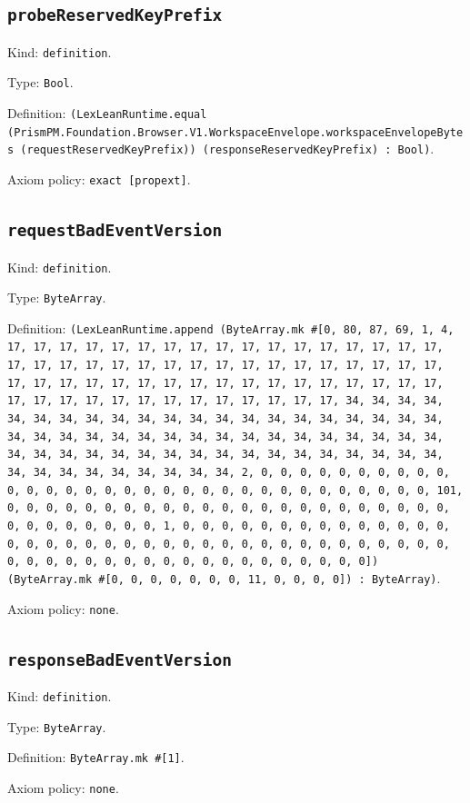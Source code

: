 \documentclass[11pt]{article}
\begin{document}
\subsection*{\texttt{probeReservedKeyPrefix}}
\noindent Kind: \texttt{definition}.\par
\noindent Type: \texttt{Bool}.\par
\noindent Definition: \texttt{(LexLeanRuntime.equal (PrismPM.Foundation.Browser.V1.WorkspaceEnvelope.workspaceEnvelopeBytes (requestReservedKeyPrefix)) (responseReservedKeyPrefix) : Bool)}.\par
\noindent Axiom policy: \texttt{exact [propext]}.\par
\subsection*{\texttt{requestBadEventVersion}}
\noindent Kind: \texttt{definition}.\par
\noindent Type: \texttt{ByteArray}.\par
\noindent Definition: \texttt{(LexLeanRuntime.append (ByteArray.mk \#[0, 80, 87, 69, 1, 4, 17, 17, 17, 17, 17, 17, 17, 17, 17, 17, 17, 17, 17, 17, 17, 17, 17, 17, 17, 17, 17, 17, 17, 17, 17, 17, 17, 17, 17, 17, 17, 17, 17, 17, 17, 17, 17, 17, 17, 17, 17, 17, 17, 17, 17, 17, 17, 17, 17, 17, 17, 17, 17, 17, 17, 17, 17, 17, 17, 17, 17, 17, 17, 17, 34, 34, 34, 34, 34, 34, 34, 34, 34, 34, 34, 34, 34, 34, 34, 34, 34, 34, 34, 34, 34, 34, 34, 34, 34, 34, 34, 34, 34, 34, 34, 34, 34, 34, 34, 34, 34, 34, 34, 34, 34, 34, 34, 34, 34, 34, 34, 34, 34, 34, 34, 34, 34, 34, 34, 34, 34, 34, 34, 34, 34, 34, 34, 34, 2, 0, 0, 0, 0, 0, 0, 0, 0, 0, 0, 0, 0, 0, 0, 0, 0, 0, 0, 0, 0, 0, 0, 0, 0, 0, 0, 0, 0, 0, 0, 0, 0, 101, 0, 0, 0, 0, 0, 0, 0, 0, 0, 0, 0, 0, 0, 0, 0, 0, 0, 0, 0, 0, 0, 0, 0, 0, 0, 0, 0, 0, 0, 0, 0, 1, 0, 0, 0, 0, 0, 0, 0, 0, 0, 0, 0, 0, 0, 0, 0, 0, 0, 0, 0, 0, 0, 0, 0, 0, 0, 0, 0, 0, 0, 0, 0, 0, 0, 0, 0, 0, 0, 0, 0, 0, 0, 0, 0, 0, 0, 0, 0, 0, 0, 0, 0, 0, 0, 0, 0, 0]) (ByteArray.mk \#[0, 0, 0, 0, 0, 0, 0, 11, 0, 0, 0, 0]) : ByteArray)}.\par
\noindent Axiom policy: \texttt{none}.\par
\subsection*{\texttt{responseBadEventVersion}}
\noindent Kind: \texttt{definition}.\par
\noindent Type: \texttt{ByteArray}.\par
\noindent Definition: \texttt{ByteArray.mk \#[1]}.\par
\noindent Axiom policy: \texttt{none}.\par
\end{document}

